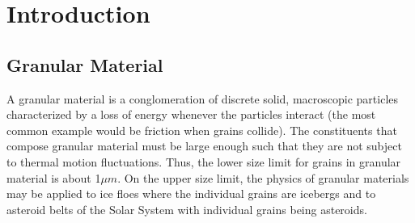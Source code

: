 %
% 


\chapter{Introduction}

\section{Granular Material}

\begin{figure}[H]
\end{figure}

A granular material is a conglomeration of discrete solid, macroscopic particles characterized by a loss of energy whenever the particles interact (the most common example would be friction when grains collide). The constituents that compose granular material must be large enough such that they are not subject to thermal motion fluctuations. Thus, the lower size limit for grains in granular material is about 1$\mu m$. On the upper size limit, the physics of granular materials may be applied to ice floes where the individual grains are icebergs and to asteroid belts of the Solar System with individual grains being asteroids. \citep{duran}

